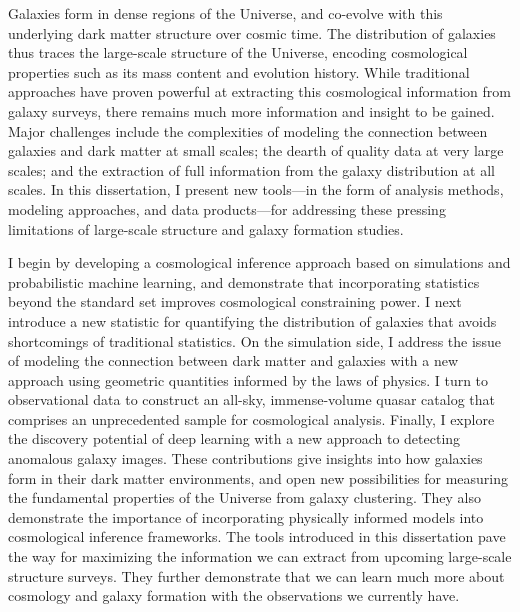 Galaxies form in dense regions of the Universe, and co-evolve with this underlying dark matter structure over cosmic time.
The distribution of galaxies thus traces the large-scale structure of the Universe, encoding cosmological properties such as its mass content and evolution history.
While traditional approaches have proven powerful at extracting this cosmological information from galaxy surveys, there remains much more information and insight to be gained.
Major challenges include the complexities of modeling the connection between galaxies and dark matter at small scales; the dearth of quality data at very large scales; and the extraction of full information from the galaxy distribution at all scales.
In this dissertation, I present new tools---in the form of analysis methods, modeling approaches, and data products---for addressing these pressing limitations of large-scale structure and galaxy formation studies.

I begin by developing a cosmological inference approach based on simulations and probabilistic machine learning, and demonstrate that incorporating statistics beyond the standard set improves cosmological constraining power.
I next introduce a new statistic for quantifying the distribution of galaxies that avoids shortcomings of traditional statistics.
On the simulation side, I address the issue of modeling the connection between dark matter and galaxies with a new approach using geometric quantities informed by the laws of physics.
I turn to observational data to construct an all-sky, immense-volume quasar catalog that comprises an unprecedented sample for cosmological analysis.
Finally, I explore the discovery potential of deep learning with a new approach to detecting anomalous galaxy images.
These contributions give insights into how galaxies form in their dark matter environments, and open new possibilities for measuring the fundamental properties of the Universe from galaxy clustering.
They also demonstrate the importance of incorporating physically informed models into cosmological inference frameworks.
The tools introduced in this dissertation pave the way for maximizing the information we can extract from upcoming large-scale structure surveys.
They further demonstrate that we can learn much more about cosmology and galaxy formation with the observations we currently have.